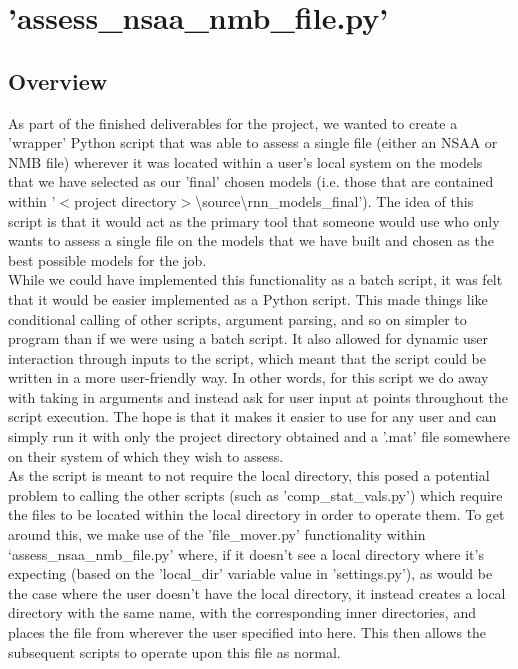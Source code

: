 \documentclass[12pt,twoside]{report}
\begin{document}
\section{'assess\_nsaa\_nmb\_file.py'}

\subsection{Overview}

\quad As part of the finished deliverables for the project, we wanted to create a 'wrapper' Python script that was able to assess a single file (either an NSAA or NMB file) wherever it was located within a user's local system on the models that we have selected as our 'final' chosen models (i.e. those that are contained within '$<$project directory$>$\textbackslash source\textbackslash rnn\_models\_final'). The idea of this script is that it would act as the primary tool that someone would use who only wants to assess a single file on the models that we have built and chosen as the best possible models for the job.\\

\quad While we could have implemented this functionality as a batch script, it was felt that it would be easier implemented as a Python script. This made things like conditional calling of other scripts, argument parsing, and so on simpler to program than if we were using a batch script. It also allowed for dynamic user interaction through inputs to the script, which meant that the script could be written in a more user-friendly way. In other words, for this script we do away with taking in arguments and instead ask for user input at points throughout the script execution. The hope is that it makes it easier to use for any user and can simply run it with only the project directory obtained and a '.mat' file somewhere on their system of which they wish to assess.\\

\quad As the script is meant to not require the local directory, this posed a potential problem to calling the other scripts (such as 'comp\_stat\_vals.py') which require the files to be located within the local directory in order to operate them. To get around this, we make use of the 'file\_mover.py' functionality within ‘assess\_nsaa\_nmb\_file.py’ where, if it doesn't see a local directory where it's expecting (based on the 'local\_dir' variable value in 'settings.py'), as would be the case where the user doesn't have the local directory, it instead creates a local directory with the same name, with the corresponding inner directories, and places the file from wherever the user specified into here. This then allows the subsequent scripts to operate upon this file as normal.
\end{document}
